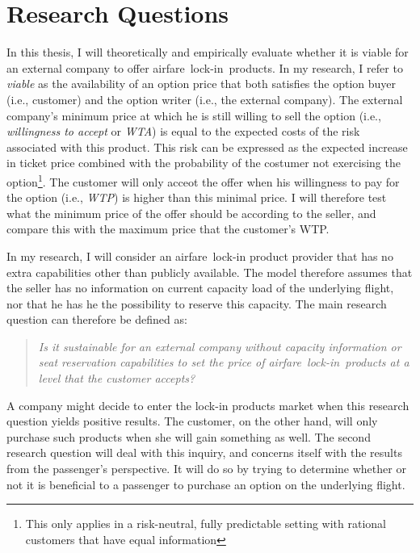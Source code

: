 \chapter{Research Questions}
\label{chap:ResearchQuestions}
In this thesis, I will theoretically and empirically evaluate whether it is viable for an external company to offer airfare~lock-in~products. In my research, I refer to \emph{viable} as the availability of an option price that both satisfies the option buyer (i.e., customer) and the option writer (i.e., the external company). The external company's minimum price at which he is still willing to sell the option (i.e., \emph{willingness to accept} or \emph{WTA}) is equal to the expected costs of the risk associated with this product. This risk can be expressed as the expected increase in ticket price combined with the probability of the costumer not exercising the option\footnote{This only applies in a risk-neutral, fully predictable setting with rational customers that have equal information}. The customer will only acceot the offer when his willingness to pay for the option (i.e., \emph{WTP}) is higher than this minimal price. I will therefore test what the minimum price of the offer should be according to the seller, and compare this with the maximum price that the customer's WTP.

In my research, I will consider an airfare~lock-in product provider that has no extra capabilities other than publicly available. The model therefore assumes that the seller has no information on current capacity load of the underlying flight, nor that he has he the possibility to reserve this capacity. The main research question can therefore be defined as:

\begin{quote}\emph{Is it sustainable for an external company without capacity information or seat reservation capabilities to set the price of airfare~lock-in~products at a level that the customer accepts?}\end{quote}

A company might decide to enter the lock-in products market when this research question yields positive results. The customer, on the other hand, will only purchase such products when she will gain something as well. The second research question will deal with this inquiry, and concerns itself with the results from the passenger's perspective. It will do so by trying to determine whether or not it is beneficial to a passenger to purchase an option on the underlying flight.

